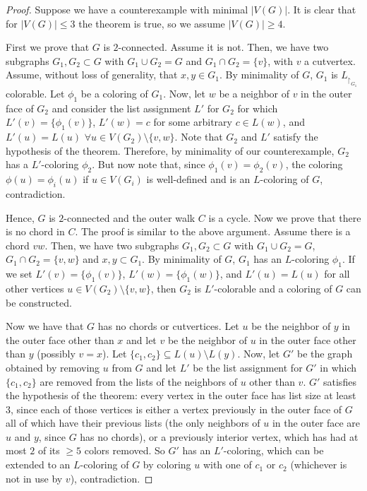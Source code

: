 \begin{proof}
Suppose we have a counterexample with minimal $|V(G)|$. It is clear that for 
$|V(G)| \leq 3$ the theorem is true, so we assume $|V(G)| \geq 4$.

First we prove that $G$ is $2$-connected. Assume it is not. Then, we have two subgraphs $G_1, G_2 \subset G$ with $G_1 \cup G_2 = G$ 
and $G_1 \cap G_2 = \{v\}$, with $v$ a cutvertex. Assume, without loss of generality, that $x, y \in G_1$. By minimality of $G$, 
$G_1$ is $L_{\restriction_{G_1}}$ colorable. Let $\phi_1$ be a coloring of $G_1$. Now, let $w$ be a neighbor of $v$ in the outer face 
of $G_2$ and consider the list assignment $L'$ for $G_2$ for which $L'(v) = \{\phi_1(v)\}$, $L'(w) = c$ for some arbitrary 
$c \in L(w)$, and $L'(u) = L(u)$ $\forall u \in V(G_2) \setminus \{v, w\}$. Note that $G_2$ and $L'$ satisfy the hypothesis 
of the theorem. Therefore, by minimality of our counterexample, $G_2$ has a $L'$-coloring $\phi_2$. But now note that, since 
$\phi_1(v) = \phi_2(v)$, the coloring $\phi(u) = \phi_i(u)$ if $u \in V(G_i)$ is well-defined and is an $L$-coloring of $G$, 
contradiction.

Hence, $G$ is $2$-connected and the outer walk $C$ is a cycle. Now we prove that there is no chord in $C$. The proof is 
similar to the above argument. Assume there is a chord $vw$. Then, we have two subgraphs $G_1, G_2 \subset G$ with 
$G_1 \cup G_2 = G$, $G_1 \cap G_2 = \{v, w\}$ and ${x, y} \subset G_1$. By minimality of $G$, $G_1$ has an $L$-coloring $\phi_1$. 
If we set $L'(v) = \{\phi_1(v)\}$, $L'(w) = \{\phi_1(w)\}$, and $L'(u) = L(u)$ for all other vertices 
$u \in V(G_2) \setminus \{v, w\}$, then $G_2$ is $L'$-colorable and a coloring of $G$ can be constructed.

Now we have that $G$ has no chords or cutvertices. Let $u$ be the neighbor of $y$ in the outer face other than 
$x$ and let $v$ be the neighbor of $u$ in the outer face other than $y$ (possibly $v = x$). Let  
$\{c_1, c_2\} \subseteq L(u) \setminus L(y)$. Now, let $G'$ be the graph obtained by removing $u$ from $G$ and let $L'$ be 
the list assignment for $G'$ in which $\{c_1, c_2\}$ are removed from the lists of the neighbors of $u$ other than 
$v$. $G'$ satisfies the hypothesis of the theorem: every vertex in the outer face has list size at least $3$, since each of those
vertices is
either a vertex previously in the outer face of $G$ all of which have their previous lists (the only neighbors of $u$ in 
the outer face are $u$ and $y$, since $G$ has no chords), or a previously interior vertex, which has had at most $2$ of its
$\geq 5$ colors removed. So $G'$ has an $L'$-coloring, which can be extended to an $L$-coloring of $G$ by coloring $u$ with one
of $c_1$ or $c_2$ (whichever is not in use by $v$), contradiction.



\end{proof}
